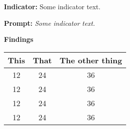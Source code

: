 \documentclass{report}
\begin{document}
\blindtext
 
\noindent\textbf{Indicator:} Some indicator text.

\noindent\textbf{Prompt:} \textit{Some indicator text.}

\noindent\textbf{Findings}

\blindtext

\begin{table}[!h]
\begin{tabular}{c | c ||| c}
This & That & The other thing \\
\hline\hline
12   &  24  &  36 \\
12   &  24  &  36 \\
12   &  24  &  36 \\
12   &  24  &  36 \\
\end{tabular}
\end{table}


\blindtext
\end{document}
